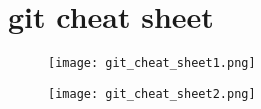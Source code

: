 \chapter{git cheat sheet}

\vspace{-50pt}

\begin{figure}[!ht]
\centering
\texttt{[image: git\_cheat\_sheet1.png]}
\end{figure}

\clearpage


\begin{figure}[!ht]
\centering
\texttt{[image: git\_cheat\_sheet2.png]}
\end{figure}